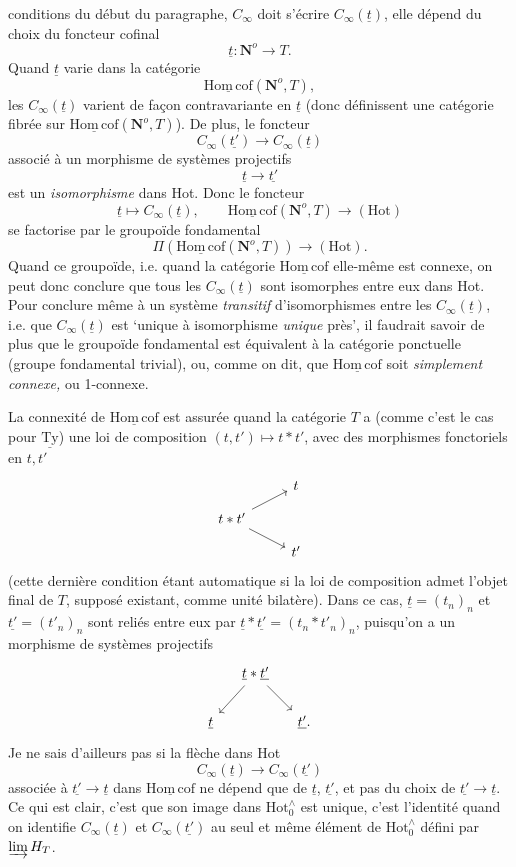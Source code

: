 \documentclass[11pt]{article}
\newcommand{\printedpage}[1]{\marginpar{\footnotesize p.~#1}}
\newcommand{\msp}[1]{\marginpar{\footnotesize [#1]}}
\newcommand{\Hot}{\mathrm{Hot}}
\newcommand{\Hotz}{\mathrm{Hot}_0^{\wedge}}
\newcommand{\Hc}{\underline{\mathrm{Hom\,cof}}}
\newcommand{\Nop}{\mathbf{N}^o}
\begin{document}
\printedpage{74}
conditions du début du paragraphe, $C_\infty$ doit s'écrire $C_\infty(\underline{t})$, elle dépend du choix du foncteur cofinal
\[
\underline{t} : \Nop \longrightarrow T.
\]
Quand $\underline{t}$ varie dans la catégorie
\[
\Hc(\Nop, T),
\]
les $C_\infty(\underline{t})$ varient de façon contravariante en $\underline{t}$ (donc définissent une catégorie fibrée sur $\Hc(\Nop, T)$). De plus, le foncteur
\[
C_\infty(\underline{t'}) \longrightarrow C_\infty(\underline{t})
\]
associé à un morphisme de systèmes projectifs
\[
\underline{t} \longrightarrow \underline{t'}
\]
est un \textit{isomorphisme} dans Hot. Donc le
\msp{page 118}
foncteur
\[
\underline{t} \longmapsto C_\infty(\underline{t}), \qquad \Hc(\Nop, T) \longrightarrow (\Hot)
\]
se factorise par le groupoïde fondamental
\[
\Pi(\Hc(\Nop, T)) \longrightarrow (\Hot).
\]
Quand ce groupoïde, i.e. quand la catégorie $\Hc$ elle-même est connexe, on peut donc conclure que tous les $C_\infty(\underline{t})$ sont isomorphes entre eux dans Hot. Pour conclure même à un système \textit{transitif} d'isomorphismes entre les $C_\infty(\underline{t})$, i.e. que $C_\infty(\underline{t})$ est ‘unique à isomorphisme \textit{unique} près’, il faudrait savoir de plus que le groupoïde fondamental est équivalent à la catégorie ponctuelle (groupe fondamental trivial), ou, comme on dit, que $\Hc$ soit \textit{simplement connexe,} ou 1-connexe.

La connexité de $\Hc$ est assurée quand la catégorie $T$ a (comme c'est le cas pour $\underline{\mathrm{Ty}}$) une loi de composition $(t,t') \longmapsto t * t'$, avec des morphismes fonctoriels en $t, t'$
\[
\begin{tikzcd}[row sep=small]
 & t \\
t * t' \arrow[ru] \arrow[rd] & \\
 & t'
\end{tikzcd}
\]
(cette dernière condition étant automatique
\printedpage{75}
\msp{page 119}
si la loi de composition admet l'objet final de $T$, supposé existant, comme unité bilatère). Dans ce cas, $\underline{t} = (t_n)_n$ et $\underline{t'} = (t'_n)_n$ sont reliés entre eux par $\underline{t} * \underline{t'} = (t_n * t'_n)_n$, puisqu'on a un morphisme de systèmes projectifs
\[
\begin{tikzcd}[column sep=small]
 & \underline{t} * \underline{t'} \arrow[ld] \arrow[rd] & \\
\underline{t} & & \underline{t'}.
\end{tikzcd}
\]
Je ne sais d'ailleurs pas si la flèche dans Hot
\[
C_\infty(\underline{t}) \longrightarrow C_\infty(\underline{t'})
\]
associée à $\underline{t'} \longrightarrow \underline{t}$ dans $\Hc$ ne dépend que de $\underline{t}$, $\underline{t'}$, et pas du choix de $\underline{t'} \longrightarrow \underline{t}$. Ce qui est clair, c'est que son image dans $\Hotz$ est unique, c'est l'identité quand on identifie $C_\infty(\underline{t})$ et $C_\infty(\underline{t'})$ au seul et même élément de $\Hotz$ défini par $\varinjlim H_T$.
\end{document}
